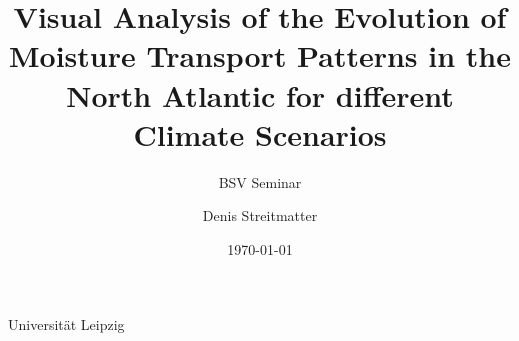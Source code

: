 \title[Future Moisture Transport Patterns]{Visual Analysis of the Evolution of Moisture Transport Patterns in the North Atlantic for different Climate Scenarios}
\subtitle[Group seminar]{BSV Seminar} 
\author{Denis Streitmatter}
\institute
{Universit\"at Leipzig}
\date{\today}



